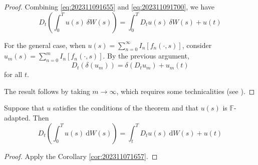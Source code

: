 \begin{proof}
	Combining \eqref{eq:202311091655} and \eqref{eq:202311091700}, we have
	$$
	D_t \left( \int_0^T u(s) ~\delta W(s) \right) = \int_0^T D_t u(s) ~\delta W(s) + u(t) 
	$$

	For the general case, when $u(s) = \sum_{n=0}^\infty I_n[f_n(\cdot, s)]$, consider $u_m(s) = \sum_{n=0}^m I_n[f_n(\cdot, s)]$. By the previous argument, 
	$$
	D_t(\delta(u_m)) = \delta(D_t u_m) + u_m(t)
	$$
	for all $t$.

	The result follows by taking $m \to \infty$, which requires some technicalities (see \cite{nunno2008malliavin}).
\end{proof}

\begin{corollary}
	Suppose that $u$ satisfies the conditions of the theorem and that $u(s)$ is $\mathbb{F}$-adapted. Then
	$$
	D_t \left( \int_0^T u(s)~\mathrm{d} W(s) \right) = \int_t^T D_t u(s) ~\mathrm{d} W(s) + u(t)
	$$

\end{corollary}

\begin{proof}
	Apply the Corollary \ref{cor:202311071657}.
\end{proof}
